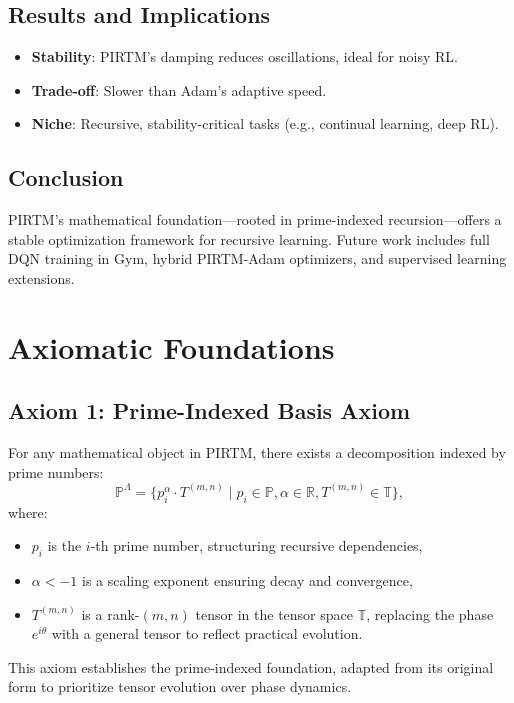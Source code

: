 \documentclass{article}
\theoremstyle{plain}
\begin{document}
 \subsection{Results and Implications}
\begin{itemize}
    \item \textbf{Stability}: PIRTM’s damping reduces oscillations, ideal for noisy RL.
    \item \textbf{Trade-off}: Slower than Adam’s adaptive speed.
    \item \textbf{Niche}: Recursive, stability-critical tasks (e.g., continual learning, deep RL).
\end{itemize}

 \subsection{Conclusion}
PIRTM’s mathematical foundation—rooted in prime-indexed recursion—offers a stable optimization framework for recursive learning. Future work includes full DQN training in Gym, hybrid PIRTM-Adam optimizers, and supervised learning extensions.


 \section{Axiomatic Foundations}

 \subsection{Axiom 1: Prime-Indexed Basis Axiom}
For any mathematical object in PIRTM, there exists a decomposition indexed by prime numbers:
\begin{equation}
    \mathbb{P}^\Lambda = \{ p_i^\alpha \cdot T^{(m,n)} \mid p_i \in \mathbb{P}, \alpha \in \mathbb{R}, T^{(m,n)} \in \mathbb{T} \},
\end{equation}
where:
\begin{itemize}
    \item \( p_i \) is the \( i \)-th prime number, structuring recursive dependencies,
    \item \( \alpha < -1 \) is a scaling exponent ensuring decay and convergence,
    \item \( T^{(m,n)} \) is a rank-$(m,n)$ tensor in the tensor space \( \mathbb{T} \), replacing the phase \( e^{i\theta} \) with a general tensor to reflect practical evolution.
\end{itemize}
This axiom establishes the prime-indexed foundation, adapted from its original form to prioritize tensor evolution over phase dynamics.
\end{document}
